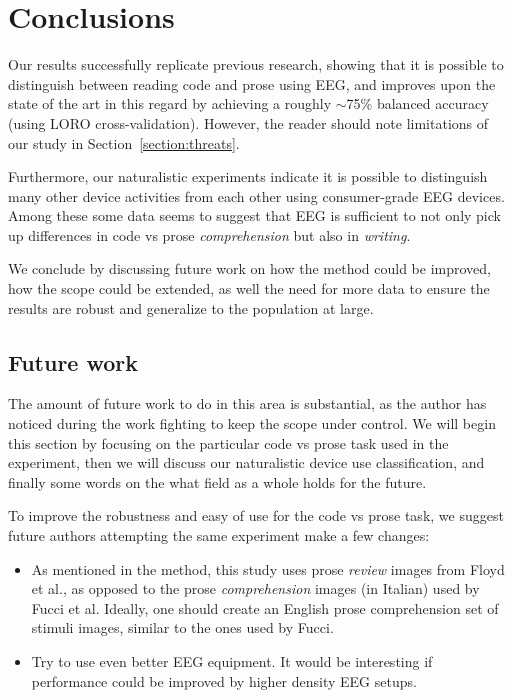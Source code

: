 \chapter{Conclusions}

Our results successfully replicate previous research, showing that it is possible to distinguish between reading code and prose using EEG, and improves upon the state of the art in this regard by achieving a roughly $\sim$75\% balanced accuracy (using LORO cross-validation). However, the reader should note limitations of our study in Section~\ref{section:threats}.

Furthermore, our naturalistic experiments indicate it is possible to distinguish many other device activities from each other using consumer-grade EEG devices. Among these some data seems to suggest that EEG is sufficient to not only pick up differences in code vs prose \emph{comprehension} but also in \emph{writing}.

We conclude by discussing future work on how the method could be improved, how the scope could be extended, as well the need for more data to ensure the results are robust and generalize to the population at large.

\section{Future work}

The amount of future work to do in this area is substantial, as the author has noticed during the work fighting to keep the scope under control. We will begin this section by focusing on the particular code vs prose task used in the experiment, then we will discuss our naturalistic device use classification, and finally some words on the what field as a whole holds for the future.

To improve the robustness and easy of use for the code vs prose task, we suggest future authors attempting the same experiment make a few changes:

\begin{itemize}
    \item As mentioned in the method, this study uses prose \emph{review} images from Floyd et al., as opposed to the prose \emph{comprehension} images (in Italian) used by Fucci et al. Ideally, one should create an English prose comprehension set of stimuli images, similar to the ones used by Fucci.
    \item Try to use even better EEG equipment. It would be interesting if performance could be improved by higher density EEG setups.
\end{itemize}

